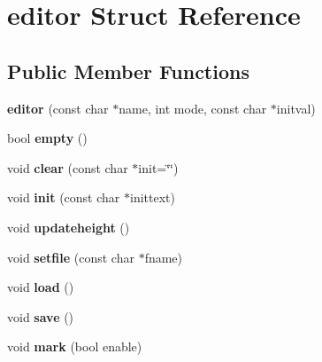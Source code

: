 \hypertarget{structeditor}{}\section{editor Struct Reference}
\label{structeditor}
\subsection*{Public Member Functions}
\begin{DoxyCompactItemize}
\item 
\mbox{\label{structeditor_a73d800d5ae8e42c056166ad8fd9f0d09}} 
{\bfseries editor} (const char $\ast$name, int mode, const char $\ast$initval)
\item 
\mbox{\label{structeditor_ae824bd24fcdcb69208c791f7cbcfdd33}} 
bool {\bfseries empty} ()
\item 
\mbox{\label{structeditor_a5ec80a331e365c594c15e7ae3e587b39}} 
void {\bfseries clear} (const char $\ast$init=\char`\"{}\char`\"{})
\item 
\mbox{\label{structeditor_ac88f39c72c21bea2c1cef32533f5f5ca}} 
void {\bfseries init} (const char $\ast$inittext)
\item 
\mbox{\label{structeditor_a412c70983695801aa20629f732bbace0}} 
void {\bfseries updateheight} ()
\item 
\mbox{\label{structeditor_ae7966c2485d7670f580b632fc35768ee}} 
void {\bfseries setfile} (const char $\ast$fname)
\item 
\mbox{\label{structeditor_a2d507562b7e1ec359303c00f8d52a9cd}} 
void {\bfseries load} ()
\item 
\mbox{\label{structeditor_a9f4fc95fea744a815c8bf0a42b2cef9a}} 
void {\bfseries save} ()
\item 
\mbox{\label{structeditor_a05196453980b40d4e831c23fc56c0f25}} 
void {\bfseries mark} (bool enable)
\item 
\mbox{\label{structeditor_aa53a80499cfc20776b37a20b5a1ff45f}} 

\end{DoxyCompactItemize}
